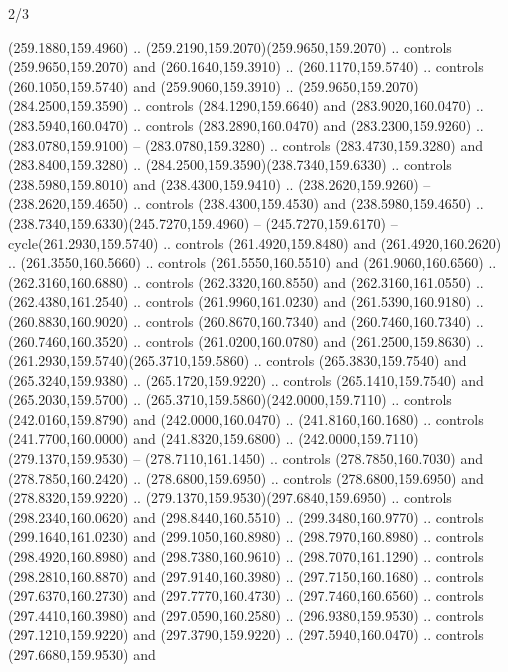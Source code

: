 \begin{flagdescription}{2/3}
\begin{scope}[xshift=0.5\flaglength,yshift=0.5\flagwidth,scale=\flagwidth/259.2]
\begin{scope}[y=0.8pt, x=0.8pt, yscale=-1,shift={(-243,-162)}]
      (259.1880,159.4960) .. (259.2190,159.2070)(259.9650,159.2070) .. controls
      (259.9650,159.2070) and (260.1640,159.3910) .. (260.1170,159.5740) .. controls
      (260.1050,159.5740) and (259.9060,159.3910) ..
      (259.9650,159.2070)(284.2500,159.3590) .. controls (284.1290,159.6640) and
      (283.9020,160.0470) .. (283.5940,160.0470) .. controls (283.2890,160.0470) and
      (283.2300,159.9260) .. (283.0780,159.9100) -- (283.0780,159.3280) .. controls
      (283.4730,159.3280) and (283.8400,159.3280) ..
      (284.2500,159.3590)(238.7340,159.6330) .. controls (238.5980,159.8010) and
      (238.4300,159.9410) .. (238.2620,159.9260) -- (238.2620,159.4650) .. controls
      (238.4300,159.4530) and (238.5980,159.4650) ..
      (238.7340,159.6330)(245.7270,159.4960) -- (245.7270,159.6170) --
      cycle(261.2930,159.5740) .. controls (261.4920,159.8480) and
      (261.4920,160.2620) .. (261.3550,160.5660) .. controls (261.5550,160.5510) and
      (261.9060,160.6560) .. (262.3160,160.6880) .. controls (262.3320,160.8550) and
      (262.3160,161.0550) .. (262.4380,161.2540) .. controls (261.9960,161.0230) and
      (261.5390,160.9180) .. (260.8830,160.9020) .. controls (260.8670,160.7340) and
      (260.7460,160.7340) .. (260.7460,160.3520) .. controls (261.0200,160.0780) and
      (261.2500,159.8630) .. (261.2930,159.5740)(265.3710,159.5860) .. controls
      (265.3830,159.7540) and (265.3240,159.9380) .. (265.1720,159.9220) .. controls
      (265.1410,159.7540) and (265.2030,159.5700) ..
      (265.3710,159.5860)(242.0000,159.7110) .. controls (242.0160,159.8790) and
      (242.0000,160.0470) .. (241.8160,160.1680) .. controls (241.7700,160.0000) and
      (241.8320,159.6800) .. (242.0000,159.7110)(279.1370,159.9530) --
      (278.7110,161.1450) .. controls (278.7850,160.7030) and (278.7850,160.2420) ..
      (278.6800,159.6950) .. controls (278.6800,159.6950) and (278.8320,159.9220) ..
      (279.1370,159.9530)(297.6840,159.6950) .. controls (298.2340,160.0620) and
      (298.8440,160.5510) .. (299.3480,160.9770) .. controls (299.1640,161.0230) and
      (299.1050,160.8980) .. (298.7970,160.8980) .. controls (298.4920,160.8980) and
      (298.7380,160.9610) .. (298.7070,161.1290) .. controls (298.2810,160.8870) and
      (297.9140,160.3980) .. (297.7150,160.1680) .. controls (297.6370,160.2730) and
      (297.7770,160.4730) .. (297.7460,160.6560) .. controls (297.4410,160.3980) and
      (297.0590,160.2580) .. (296.9380,159.9530) .. controls (297.1210,159.9220) and
      (297.3790,159.9220) .. (297.5940,160.0470) .. controls (297.6680,159.9530) and

\end{scope}
\end{scope}
\end{flagdescription}
